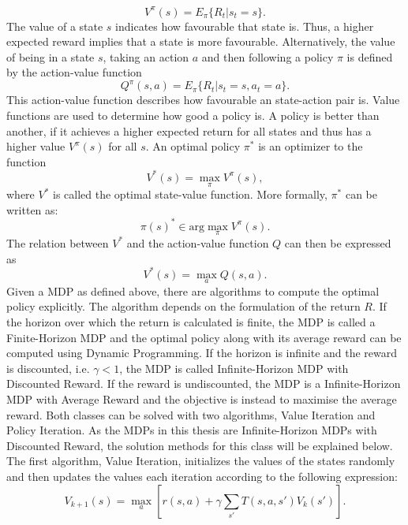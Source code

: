 \documentclass[../main.tex]{subfiles}
\begin{document}
\begin{equation}
V^\pi(s) = E_\pi\{R_t|s_t = s\}.
\end{equation}
The value of a state $s$ indicates how favourable that state is. Thus, a higher expected reward implies that a state is more favourable. Alternatively, the value of being in a state $s$, taking an action $a$ and then following a policy $\pi$ is defined by the action-value function
\begin{equation}
Q^\pi(s,a) = E_\pi\{R_t|s_t = s, a_t = a\}.
\end{equation}
This action-value function describes how favourable an state-action pair is. Value functions are used to determine how good a policy is. A policy is better than another, if it achieves a higher expected return for all states and thus has a higher value $V^\pi(s)$ for all $s$. An optimal policy $\pi^*$ is an optimizer to the function
\begin{equation}
V^*(s) = \max_\pi V^\pi(s),
\end{equation}
where $V^*$ is called the optimal state-value function. More formally, $\pi^*$ can be written as:
\begin{equation}
\pi(s)^* \in \text{arg}\max_\pi V^\pi(s).
\end{equation}
The relation between $V^*$ and the action-value function $Q$ can then be expressed as 
\begin{equation}
    V^*(s) = \max_a Q(s,a).
\end{equation}
Given a MDP as defined above, there are algorithms to compute the optimal policy explicitly. The algorithm depends on the formulation of the return $R$. If the horizon over which the return is calculated is finite, the MDP is called a Finite-Horizon MDP and the optimal policy along with its average reward can be computed using Dynamic Programming. If the horizon is infinite and the reward is discounted, i.e. $\gamma<1$, the MDP is called Infinite-Horizon MDP with Discounted Reward. If the reward is undiscounted, the MDP is a Infinite-Horizon MDP with Average Reward and the objective is instead to maximise the average reward. Both classes can be solved with two algorithms, Value Iteration and Policy Iteration. As the MDPs in this thesis are Infinite-Horizon MDPs with Discounted Reward, the solution methods for this class will be explained below.
The first algorithm, Value Iteration, initializes the values of the states randomly and then updates the values each iteration according to the following expression:
\begin{equation}
    V_{k+1}(s) = \max_a \left[ r(s,a) + \gamma  \sum_{s'} T(s,a,s')V_k(s') \right].
\end{equation}
\end{document}
